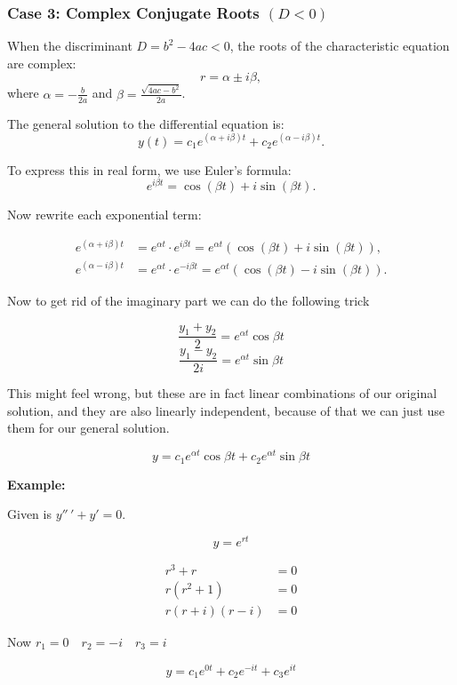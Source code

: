 \subsubsection{Case 3: Complex Conjugate Roots \texorpdfstring{\( (D < 0) \)}{}}

When the discriminant \( D = b^2 - 4ac < 0 \), the roots of the characteristic equation are complex:
\[
r = \alpha \pm i\beta,
\]
where \( \alpha = -\frac{b}{2a} \) and \( \beta = \frac{\sqrt{4ac - b^2}}{2a} \).

The general solution to the differential equation is:
\[
y(t) = c_1 e^{(\alpha + i\beta)t} + c_2 e^{(\alpha - i\beta)t}.
\]

To express this in real form, we use Euler’s formula:
\[
e^{i\beta t} = \cos(\beta t) + i\sin(\beta t).
\]

Now rewrite each exponential term:

\begin{align*}
e^{(\alpha + i\beta)t} &= e^{\alpha t} \cdot e^{i\beta t} = e^{\alpha t} (\cos(\beta t) + i \sin(\beta t)), \\
e^{(\alpha - i\beta)t} &= e^{\alpha t} \cdot e^{-i\beta t} = e^{\alpha t} (\cos(\beta t) - i \sin(\beta t)).
\end{align*}

Now to get rid of the imaginary part we can do the following trick

\[\frac{y_1 + y_2}{2} = e^{\alpha t}\cos\beta t\]
\[\frac{y_1 - y_2}{2i} = e^{\alpha t}\sin\beta t\]

This might feel wrong, but these are in fact linear combinations of our original solution,
and they are also linearly independent, because of that we can just use them for our general solution.

\[y = c_1 e^{\alpha t}\cos\beta t + c_2  e^{\alpha t}\sin\beta t\]

\textbf{Example:}
\vspace{\baselineskip}

Given is \(y''\,' + y' = 0\).

\[y = e^{rt}\]

\begin{align*}
r^3 + r &= 0\\
r(r^2 + 1) &= 0\\
r(r + i)(r - i) &= 0
\end{align*}

Now \(r_1 = 0 \quad r_2 = -i \quad r_3 = i\)

\[y = c_1 e^{0t} + c_2 e^{-it} + c_3 e^{it}\]

